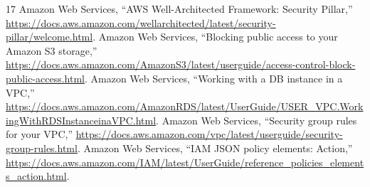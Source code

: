 \documentclass[conference]{IEEEtran}
\begin{document}
\begin{thebibliography}{17}
 Amazon Web Services, ``AWS Well-Architected Framework: Security Pillar,'' \url{https://docs.aws.amazon.com/wellarchitected/latest/security-pillar/welcome.html}.
 Amazon Web Services, ``Blocking public access to your Amazon S3 storage,'' \url{https://docs.aws.amazon.com/AmazonS3/latest/userguide/access-control-block-public-access.html}.
 Amazon Web Services, ``Working with a DB instance in a VPC,'' \url{https://docs.aws.amazon.com/AmazonRDS/latest/UserGuide/USER_VPC.WorkingWithRDSInstanceinaVPC.html}.
 Amazon Web Services, ``Security group rules for your VPC,'' \url{https://docs.aws.amazon.com/vpc/latest/userguide/security-group-rules.html}.
 Amazon Web Services, ``IAM JSON policy elements: Action,'' \url{https://docs.aws.amazon.com/IAM/latest/UserGuide/reference_policies_elements_action.html}.
\end{thebibliography}
\end{document}
